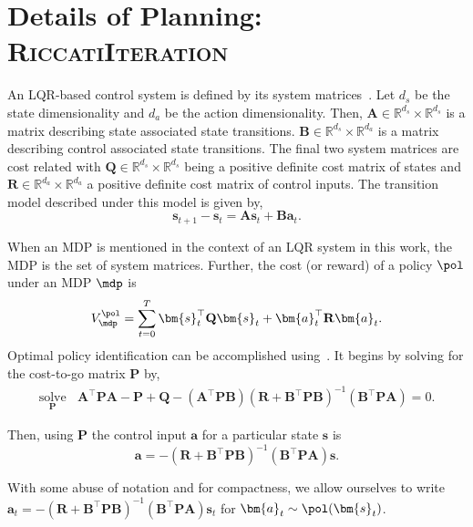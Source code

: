 \section{Details of Planning: \textsc{RiccatiIteration}}\label{sec:riccati}
An LQR-based control system is defined by its system matrices~\citep{kalman1960new}. Let $d_s$ be the state dimensionality and $d_a$ be the action dimensionality. Then, $\mathbf{A} \in \mathbb{R}^{d_s}\times\mathbb{R}^{d_s}$ is a matrix describing state associated state transitions. $\mathbf{B} \in \mathbb{R}^{d_s}\times\mathbb{R}^{d_a}$ is a matrix describing control associated state transitions. The final two system matrices are cost related with $\mathbf{Q} \in \mathbb{R}^{d_s}\times\mathbb{R}^{d_s}$ being a positive definite cost matrix of states and $\mathbf{R} \in \mathbb{R}^{d_a}\times\mathbb{R}^{d_a}$ a positive definite cost matrix of control inputs. The transition model described under this model is given by,
\begin{equation}
   \bm{s}_{t+1}-\bm{s}_t = \mathbf{A}\bm{s}_t + \mathbf{B}\bm{a}_t.
\end{equation}

When an MDP is mentioned in the context of an LQR system in this work, the MDP is the set of system matrices. Further, the cost (or reward) of a policy $\pol$ under an MDP $\mdp$ is
\begin{equation}
    V_{\mdp}^\pol = \sum_{t=0}^T \bm{s}_t^\top \mathbf{Q}\bm{s}_t + \bm{a}_t^\top \mathbf{R}\bm{a}_t.
\end{equation}
Optimal policy identification can be accomplished using~\citep{willems1971least}. It begins by solving for the cost-to-go matrix $\mathbf{P}$ by,
\begin{align*}
   \underset{\mathbf{P}}{\textrm{solve}}~~~~\mathbf{A}^\top \mathbf{P}\mathbf{A}-\mathbf{P}+\mathbf{Q}-(\mathbf{A}^\top \mathbf{P}\mathbf{B})(\mathbf{R}+\mathbf{B}^\top\mathbf{P}\mathbf{B})^{-1}(\mathbf{B}^\top \mathbf{P}\mathbf{A}) = 0.
\end{align*}

Then, using $\mathbf{P}$ the control input $\bm{a}$ for a particular state $\bm{s}$ is
\begin{equation}
   \bm{a} = -(\mathbf{R}+\mathbf{B}^\top\mathbf{P}\mathbf{B})^{-1}(\mathbf{B}^\top\mathbf{P}\mathbf{A})\bm{s}.
\end{equation}

With some abuse of notation and for compactness, we allow ourselves to write $\bm{a}_t = -(\mathbf{R}+\mathbf{B}^\top\mathbf{P}\mathbf{B})^{-1}(\mathbf{B}^\top\mathbf{P}\mathbf{A})\bm{s}_t$ for $\bm{a}_t \sim \pol(\bm{s}_t)$.

